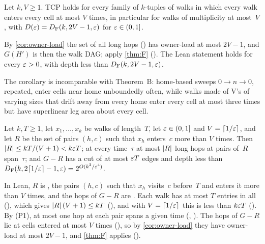 \begin{corollary}\label{cor:entry-tcp}
Let $k,V\ge1$. TCP holds for every family of $k$-tuples of walks in which every walk enters every cell at most $V$ times,
in particular for walks of multiplicity at most~$V$, with $D(\varepsilon)=D_{\mathrm F}(k,2V-1,\varepsilon)$ for $\varepsilon\in(0,1]$.
\end{corollary}

\begin{outline}
By \cref{cor:owner-load} the set of all long hops () has owner-load at most $2V-1$, and $G(H')$ is then the
walk DAG; apply \cref{thm:F} (). The Lean statement holds for every $\varepsilon>0$, with depth less
than $D_{\mathrm F}(k,2V-1,\varepsilon)$.
\end{outline}

The corollary is incomparable with Theorem~B: home-based sweeps $0\to n\to0$, repeated, enter cells near home unboundedly
often, while walks made of V's of varying sizes that drift away from every home enter every cell at most three times
but have superlinear leg area about every cell.

\begin{corollary}\label{cor:capacity}
Let $k,T\ge1$, let $x_1,\dots,x_k$ be walks of length~$T$, let $\varepsilon\in(0,1]$ and $V=\lceil1/\varepsilon\rceil$, and let $R$ be
the set of pairs $(h,c)$ such that $x_h$ enters~$c$ more than $V$ times. Then $\lvert R \rvert\le kT/(V+1)<k\varepsilon T$; at every
time~$\tau$ at most $\lvert R \rvert$ long hops at pairs of~$R$ span~$\tau$; and $G-R$ has a cut of at most $\varepsilon T$ edges and depth less than
$D_{\mathrm F}(k,2\lceil1/\varepsilon\rceil-1,\varepsilon)=2^{O(k^3/\varepsilon^4)}$.
\end{corollary}

\begin{outline}
In Lean, $R$ is , the pairs $(h,c)$ such that $x_h$ visits~$c$ before~$T$ and enters it more than $V$
times, and the hops of $G-R$ are . Each walk has at most $T$ entries in all
(), which gives $\lvert R \rvert\,(V+1)\le kT$ (), and with
$V=\lceil1/\varepsilon\rceil$ this is less than $k\varepsilon T$ (). By (P1), at most one hop at each pair spans a
given time (, ). The hops of $G-R$ lie at cells entered at most $V$ times
(), so by \cref{cor:owner-load} they have owner-load at most $2V-1$, and \cref{thm:F} applies
().
\end{outline}

